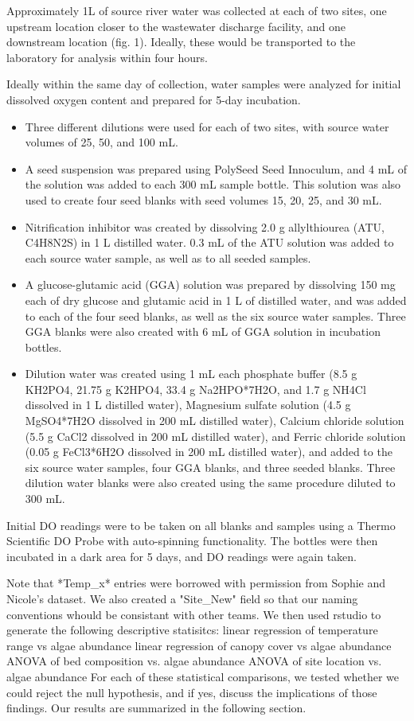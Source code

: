 \documentclass{article}\usepackage[]{graphicx}\usepackage[]{color}
\begin{document}
Approximately 1L of source river water was collected at each of two sites, one upstream location closer to the wastewater discharge facility, and one downstream location (fig. 1). Ideally, these would be transported to the laboratory for analysis within four hours.

Ideally within the same day of collection, water samples were analyzed for initial dissolved oxygen content and prepared for 5-day incubation.  
\begin{itemize}
  \item Three different dilutions were used for each of two sites, with source water volumes of 25, 50, and 100 mL. 
  \item A seed suspension was prepared using PolySeed Seed Innoculum, and 4 mL of the solution was added to each 300 mL sample bottle. This solution was also used to create four seed blanks with seed volumes 15, 20, 25, and 30 mL.
  \item Nitrification inhibitor was created by dissolving 2.0 g allylthiourea (ATU, C4H8N2S) in 1 L distilled water. 0.3 mL of the ATU solution was added to each source water sample, as well as to all seeded samples. 
  \item A glucose-glutamic acid (GGA) solution was prepared by dissolving 150 mg each of dry glucose and glutamic acid in 1 L of distilled water, and was added to each of the four seed blanks, as well as the six source water samples. Three GGA blanks were also created with 6 mL of GGA solution in incubation bottles. 
  \item Dilution water was created using 1 mL each phosphate buffer (8.5 g KH2PO4, 21.75 g K2HPO4, 33.4 g Na2HPO*7H2O, and 1.7 g NH4Cl dissolved in 1 L distilled water), Magnesium sulfate solution (4.5 g MgSO4*7H2O dissolved in 200 mL distilled water), Calcium chloride solution (5.5 g CaCl2 dissolved in 200 mL distilled water), and Ferric chloride solution (0.05 g FeCl3*6H2O dissolved in 200 mL distilled water), and added to the six source water samples, four GGA blanks, and three seeded blanks. Three dilution water blanks were also created using the same procedure diluted to 300 mL.
\end{itemize}
Initial DO readings were to be taken on all blanks and samples using a Thermo Scientific DO Probe with auto-spinning functionality. The bottles were then incubated in a dark area for 5 days, and DO readings were again taken.  

Note that *Temp\_x* entries were borrowed with permission from Sophie and Nicole's dataset. We also created a "Site\_New" field so that our naming conventions whould be consistant with other teams. We then used rstudio to generate the following descriptive statisitcs:  
linear regression of temperature range vs algae abundance
linear regression of canopy cover vs algae abundance
ANOVA of bed composition vs. algae abundance
ANOVA of site location vs. algae abundance
For each of these statistical comparisons, we tested whether we could reject the null hypothesis, and if yes, discuss the implications of those findings. Our results are summarized in the following section. 
\end{document}
